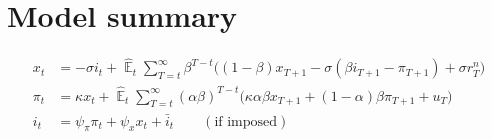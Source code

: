 \documentclass[11pt]{article}
\renewcommand{\[}{\begin{equation}}
\renewcommand{\]}{\end{equation}}
\DeclareMathOperator{\E}{\mathbb{E}}
\newcommand\numberthis{\addtocounter{equation}{1}\tag{\theequation}} %
\begin{document}


\newpage
\appendix
\section{Model summary}

\vspace{-0.5cm}

\begin{align}
x_t &=  -\sigma i_t +\hat{\E}_t \sum_{T=t}^{\infty} \beta^{T-t }\big( (1-\beta)x_{T+1} - \sigma(\beta i_{T+1} - \pi_{T+1}) +\sigma r_T^n \big)  \label{prestons18}  \\
\pi_t &= \kappa x_t +\hat{\E}_t \sum_{T=t}^{\infty} (\alpha\beta)^{T-t }\big( \kappa \alpha \beta x_{T+1} + (1-\alpha)\beta \pi_{T+1} + u_T\big) \label{prestons19}  \\
i_t &= \psi_{\pi}\pi_t + \psi_{x} x_t  + \bar{i}_t \label{TR} \quad \quad (\text{if imposed})
\end{align}

\vspace{-1.2cm}
\end{document}
